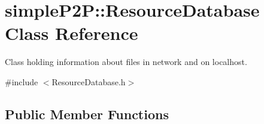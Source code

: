 \hypertarget{classsimpleP2P_1_1ResourceDatabase}{}\section{simple\+P2P\+:\+:Resource\+Database Class Reference}
\label{classsimpleP2P_1_1ResourceDatabase}


Class holding information about files in network and on localhost.  




{\ttfamily \#include $<$Resource\+Database.\+h$>$}

\subsection*{Public Member Functions}
